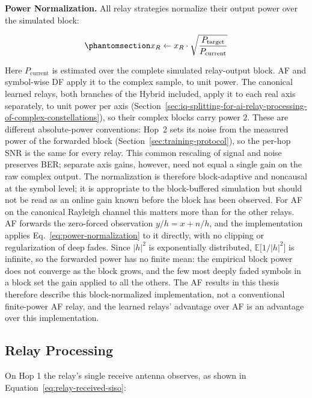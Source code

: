 \textbf{Power Normalization.} All relay strategies normalize their output power over the simulated block:

\begin{equation}\protect\phantomsection\label{eq:power-normalization}{x_R \leftarrow x_R \cdot \sqrt{\frac{P_{\text{target}}}{P_{\text{current}}}}
}\end{equation}

Here \(P_{\text{current}}\) is estimated over the complete simulated relay-output block. AF and symbol-wise DF apply it to the complex sample, to unit power. The canonical learned relays, both branches of the Hybrid included, apply it to each real axis separately, to unit power per axis (Section~\ref{sec:iq-splitting-for-ai-relay-processing-of-complex-constellations}), so their complex blocks carry power $2$. These are different absolute-power conventions: Hop~2 sets its noise from the measured power of the forwarded block (Section~\ref{sec:training-protocol}), so the per-hop SNR is the same for every relay. This common rescaling of signal and noise preserves BER; separate axis gains, however, need not equal a single gain on the raw complex output. The normalization is therefore block-adaptive and noncausal at the symbol level; it is appropriate to the block-buffered simulation but should not be read as an online gain known before the block has been observed. For AF on the canonical Rayleigh channel this matters more than for the other relays. AF forwards the zero-forced observation $y/h = x + n/h$, and the implementation applies Eq.~\eqref{eq:power-normalization} to it directly, with no clipping or regularization of deep fades. Since $|h|^{2}$ is exponentially distributed, $\mathbb{E}\bigl[1/|h|^{2}\bigr]$ is infinite, so the forwarded power has no finite mean: the empirical block power does not converge as the block grows, and the few most deeply faded symbols in a block set the gain applied to all the others. The AF results in this thesis therefore describe this block-normalized implementation, not a conventional finite-power AF relay, and the learned relays' advantage over AF is an advantage over this implementation.

\subsection{Relay Processing}\label{sec:relay-processing-methods}

On Hop 1 the relay's single receive antenna observes, as shown in Equation~\ref{eq:relay-received-siso}:

